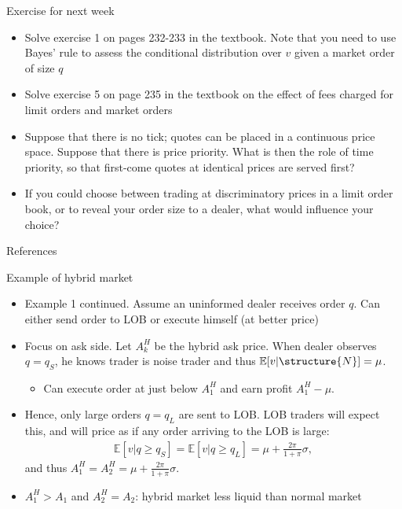 \documentclass[english,10pt]{beamer}
\begin{document}
\begin{frame}{Exercise for next week}
	\begin{itemize}
		\item Solve exercise 1 on pages 232-233 in the textbook. Note that you need to use Bayes' rule to assess the conditional distribution over $v$ given a market order of size $q$
		\item Solve exercise 5 on page 235 in the textbook on the effect of fees charged for limit orders and market orders
		\item Suppose that there is no tick; quotes can  be placed in a continuous price space. Suppose that there is price priority. What is then the role of time priority, so that first-come quotes at identical prices are served first?
		\item If you could choose between trading at discriminatory prices in a limit order book, or to reveal your order size to a dealer, what would influence your choice?
	\end{itemize}
\end{frame}





\appendix
\begin{frame}[allowframebreaks]{References}


\end{frame}


\begin{frame}[label=hybrid]{Example of hybrid market}
	\begin{itemize}
		\item Example 1 continued. Assume an uninformed dealer receives order $q$. Can either send order to LOB or execute himself (at better price) 
		\item Focus on ask side. Let $A^H_k$ be the hybrid ask price. When dealer observes $q=q_S$, he knows trader is noise trader and thus $\mathbb{E}[v|\structure{N}]=\mu$. 
		\begin{itemize}
			\item Can execute order at just below $A^H_1$ and earn profit $A^H_1-\mu$.
		\end{itemize}
		\item Hence, only large orders $q=q_L$ are sent to LOB. LOB traders will expect this, and will price as if any order arriving to the LOB is large:
		\begin{align*}
		\mathbb{E}[v|q \ge q_S]=\mathbb{E}[v|q \ge q_L]=\mu+\frac{2\pi}{1+\pi} \sigma,
		\end{align*}
		and thus $A^H_1=A^H_2=\mu+\frac{2\pi}{1+\pi} \sigma$.
		\item $A^H_1>A_1$ and $A^H_2=A_2$: hybrid market less liquid than normal market
	\end{itemize}
	\hyperlink{hybridorg}{}
\end{frame}
\end{document}
